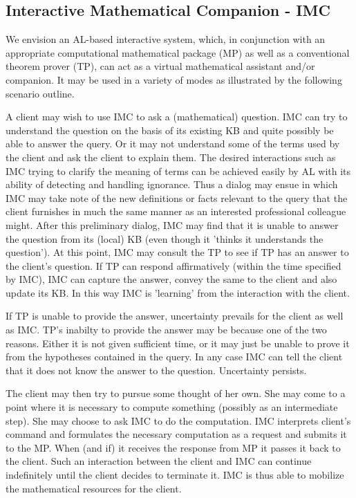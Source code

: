 

\subsection{Interactive Mathematical Companion - IMC}
We envision an AL-based interactive system, which, in conjunction with
an appropriate computational mathematical package (MP) as well as a
conventional theorem prover (TP), can act as a virtual mathematical
assistant and/or companion. 
It may be used in a variety of modes as illustrated by the
following scenario outline.

A client may wish to use IMC to ask a (mathematical) question. IMC can
try to understand the question on the basis of its existing KB and
quite possibly be able to answer the query. Or it may not understand
some of the terms used by the client and ask the client to explain
them.  The desired interactions such as IMC trying to clarify the
meaning of terms can be achieved easily by AL with its ability of
detecting and handling ignorance.  Thus a dialog may ensue in which
IMC may take note of the new definitions or facts relevant to the
query that the client furnishes in much the same manner as an
interested professional colleague might. After this preliminary
dialog, IMC may find that it is unable to answer the question from its
(local) KB (even though it 'thinks it understands the question'). At
this point, IMC may consult the TP to see if TP has an answer to the
client's question. If TP can respond affirmatively (within the time
specified by IMC), IMC can capture the answer, convey the same to the
client and also update its KB. In this way IMC is 'learning' from the
interaction with the client.

If TP is unable to provide the answer, uncertainty prevails for the
client as well as IMC. TP's inabilty to provide the answer may be
because one of the two reasons. Either it is not given sufficient
time, or it may just be unable to prove it from the hypotheses
contained in the query. In any case IMC can tell the client that it
does not know the answer to the question. Uncertainty persists.

The client may then try to pursue some thought of her own. She may
come to a point where it is necessary to compute something (possibly
as an intermediate step). She may choose to ask IMC to do the
computation. IMC interprets client's command and formulates the
necessary computation as a request and submits it to the MP. When (and
if) it receives the response from MP it passes it back to the client.
Such an interaction between the client and IMC can continue
indefinitely until the client decides to terminate it. IMC is thus
able to mobilize the mathematical resources for the client.

